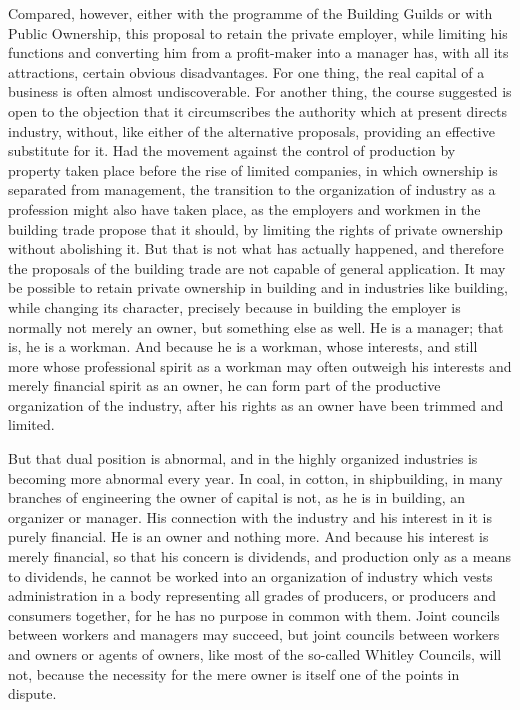 \documentclass{book}
\begin{document}
Compared, however, either with the programme of the Building Guilds or with Public Ownership, this proposal to retain the private employer, while limiting his functions and converting him from a profit-maker into a manager has, with all its attractions, certain obvious disadvantages. For one thing, the real capital of a business is often almost undiscoverable. For another thing, the course suggested is open to the objection that it circumscribes the authority which at present directs industry, without, like either of the alternative proposals, providing an effective substitute for it. Had the movement against the control of production by property taken place before the rise of limited companies, in which ownership is separated from management, the transition to the organization of industry as a profession might also have taken place, as the employers and workmen in the building trade propose that it should, by limiting the rights of private ownership without abolishing it. But that is not what has actually happened, and therefore the proposals of the building trade are not capable of general application. It may be possible to retain private ownership in building and in industries like building, while changing its character, precisely because in building the employer is normally not merely an owner, but something else as well. He is a manager; that is, he is a workman. And because he is a workman, whose interests, and still more whose professional spirit as a workman may often outweigh his interests and merely financial spirit as an owner, he can form part of the productive organization of the industry, after his rights as an owner have been trimmed and limited.

But that dual position is abnormal, and in the highly organized industries is becoming more abnormal every year. In coal, in cotton, in shipbuilding, in many branches of engineering the owner of capital is not, as he is in building, an organizer or manager. His connection with the industry and his interest in it is purely financial. He is an owner and nothing more. And because his interest is merely financial, so that his concern is dividends, and production only as a means to dividends, he cannot be worked into an organization of industry which vests administration in a body representing all grades of producers, or producers and consumers together, for he has no purpose in common with them. Joint councils between workers and managers may succeed, but joint councils between workers and owners or agents of owners, like most of the so-called Whitley Councils, will not, because the necessity for the mere owner is itself one of the points in dispute.
\end{document}
